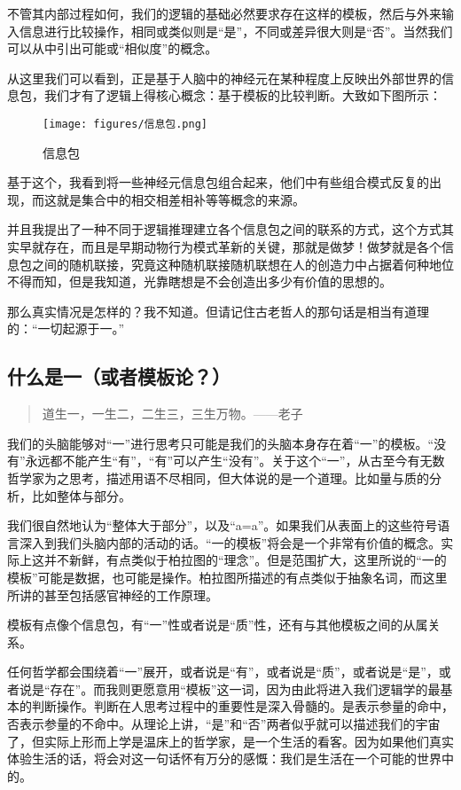 \documentclass[11pt,oneside]{article}
\begin{document}
不管其内部过程如何，我们的逻辑的基础必然要求存在这样的模板，然后与外来输入信息进行比较操作，相同或类似则是“是”，不同或差异很大则是“否”。当然我们可以从中引出可能或“相似度”的概念。

从这里我们可以看到，正是基于人脑中的神经元在某种程度上反映出外部世界的信息包，我们才有了逻辑上得核心概念：基于模板的比较判断。大致如下图所示：
\begin{figure}[H]
\centering
\texttt{[image: figures/信息包.png]}
\caption{信息包}
\end{figure}

基于这个，我看到将一些神经元信息包组合起来，他们中有些组合模式反复的出现，而这就是集合中的相交相差相补等等概念的来源。

并且我提出了一种不同于逻辑推理建立各个信息包之间的联系的方式，这个方式其实早就存在，而且是早期动物行为模式革新的关键，那就是做梦！做梦就是各个信息包之间的随机联接，究竟这种随机联接随机联想在人的创造力中占据着何种地位不得而知，但是我知道，光靠瞎想是不会创造出多少有价值的思想的。

那么真实情况是怎样的？我不知道。但请记住古老哲人的那句话是相当有道理的：“一切起源于一。”

\subsection{什么是一（或者模板论？）}
\label{sec-1-1}
\begin{quote}
道生一，一生二，二生三，三生万物。——老子
\end{quote}

我们的头脑能够对“一”进行思考只可能是我们的头脑本身存在着“一”的模板。“没有”永远都不能产生“有”，“有”可以产生“没有”。关于这个“一”，从古至今有无数哲学家为之思考，描述用语不尽相同，但大体说的是一个道理。比如量与质的分析，比如整体与部分。

我们很自然地认为“整体大于部分”，以及“a=a”。如果我们从表面上的这些符号语言深入到我们头脑内部的活动的话。“一的模板”将会是一个非常有价值的概念。实际上这并不新鲜，有点类似于柏拉图的“理念”。但是范围扩大，这里所说的“一的模板”可能是数据，也可能是操作。柏拉图所描述的有点类似于抽象名词，而这里所讲的甚至包括感官神经的工作原理。

模板有点像个信息包，有“一”性或者说是“质”性，还有与其他模板之间的从属关系。

任何哲学都会围绕着“一”展开，或者说是“有”，或者说是“质”，或者说是“是”，或者说是“存在”。而我则更愿意用“模板”这一词，因为由此将进入我们逻辑学的最基本的判断操作。判断在人思考过程中的重要性是深入骨髓的。是表示参量的命中，否表示参量的不命中。从理论上讲，“是”和“否”两者似乎就可以描述我们的宇宙了，但实际上形而上学是温床上的哲学家，是一个生活的看客。因为如果他们真实体验生活的话，将会对这一句话怀有万分的感慨：我们是生活在一个可能的世界中的。
\end{document}

